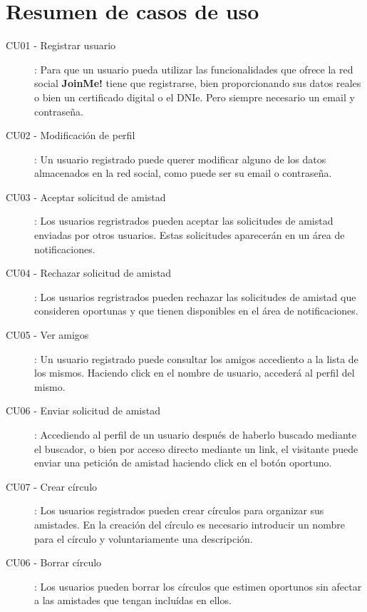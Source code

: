 \documentclass[12pt, a4paper, titlepage]{article}
\begin{document}
\section{Resumen de casos de uso}

\begin{description}
    \item [CU01 - Registrar usuario]: Para que un usuario pueda utilizar las funcionalidades que ofrece la red social \textbf{JoinMe!} tiene que registrarse, bien proporcionando sus datos reales o bien un certificado digital
o el DNIe. Pero siempre necesario un email y contraseña.
   	\item [CU02 - Modificación de perfil]: Un usuario registrado puede querer modificar alguno de los datos almacenados en la red social, como puede ser su email o contraseña.
    \item [CU03 - Aceptar solicitud de amistad]: Los usuarios regristrados pueden aceptar las solicitudes de amistad enviadas por otros usuarios. Estas solicitudes aparecerán en un área de notificaciones.
    
    \item [CU04 - Rechazar solicitud de amistad]: Los usuarios regristrados pueden rechazar las solicitudes de amistad que consideren oportunas y que tienen disponibles en el área de notificaciones.
    
    \item [CU05 - Ver amigos]: Un usuario registrado puede consultar los amigos accediento a la lista de los mismos. Haciendo click en el nombre de usuario, accederá al perfil del mismo.
    
    \item [CU06 - Enviar solicitud de amistad]: Accediendo al perfil de un usuario después de haberlo buscado mediante el buscador, o bien por acceso directo mediante un link, el visitante puede enviar una petición de amistad haciendo click en el botón oportuno.
    
    \item [CU07 - Crear círculo]: Los usuarios registrados pueden crear círculos para organizar sus amistades. En la creación del círculo es necesario introducir un nombre para el círculo y voluntariamente una descripción.
    
    \item [CU06 - Borrar círculo]: Los usuarios pueden borrar los círculos que estimen oportunos sin afectar a las amistades que tengan incluídas en ellos.
    

\end{description}
\end{document}

